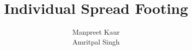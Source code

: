 \title{Individual Spread Footing}
\author{Manpreet Kaur\\ Amritpal Singh}
\begin{titlepage}
     \maketitle
    \tableofcontents
    \listoffigures
    \listofcharts
    \listoftables
\end{titlepage}
